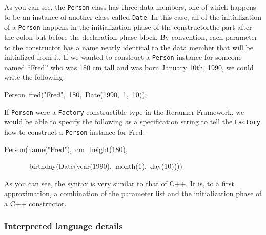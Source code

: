 \documentclass[a4paper]{article}
\let\textquotedbl="
\newenvironment{lyxcode}
{\par\begin{list}{}{
\scriptsize
\setlength{\leftmargin}{0.1in}
\setlength{\rightmargin}{\leftmargin}
\setlength{\listparindent}{0pt}%
\raggedright
\setlength{\itemsep}{0pt}
\setlength{\parsep}{0pt}
\normalfont\ttfamily}%
 \item[]}
{\end{list}}
\begin{document}
As you can see, the \texttt{Person} class has three data members,
one of which happens to be an instance of another class called \texttt{Date}.
In this case, all of the initialization of a \texttt{Person} happens
in the initialization phase of the constructor\textemdash{}the part
after the colon but before the declaration phase block. By convention,
each parameter to the constructor has a name nearly identical to the
data member that will be initialized from it. If we wanted to construct
a \texttt{Person} instance for someone named \textquotedblleft{}Fred\textquotedblright{}
who was 180 cm tall and was born January 10th, 1990, we could write
the following:
\begin{lyxcode}
Person~fred(\textquotedbl{}Fred\textquotedbl{},~180,~Date(1990,~1,~10));
\end{lyxcode}
If \texttt{Person} were a \texttt{Factory}-constructible type in the
Reranker Framework, we would be able to specify the following as a
specification string to tell the \texttt{Factory} how to construct
a \texttt{Person} instance for Fred:
\begin{lyxcode}
Person(name(\textquotedbl{}Fred\textquotedbl{}),~cm\_height(180),

~~~~~~~birthday(Date(year(1990),~month(1),~day(10))))
\end{lyxcode}
As you can see, the syntax is very similar to that of C++. It is,
to a first approximation, a combination of the parameter list and
the initialization phase of a C++ constructor.


\subsubsection{Interpreted language details}
\end{document}
